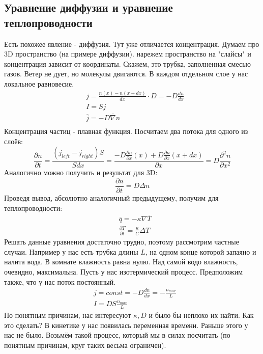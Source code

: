 \documentclass[a4paper, 12pt]{article}
\begin{document}
	\subsection{Уравнение диффузии и уравнение теплопроводности}
	Есть похожее явление - диффузия. Тут уже отличается концентрация. Думаем про 3D пространство (на примере диффузии). нарежем пространство на "слайсы" и концентрация зависит от координаты. Скажем, это трубка, заполненная смесью газов. Ветер не дует, но молекулы двигаются. В каждом отдельном слое у нас локальное равновесие.
	\begin{equation*}
		\begin{aligned}
			& j = \frac{n(x)-n(x+dx)}{dx} \cdot D = - D \frac{dn}{dx} \\
			& I = Sj                                                  \\
			& \overline{j} = - D \overline{\nabla} n                  \\
		\end{aligned}
	\end{equation*}
	Концентрация частиц - плавная функция. Посчитаем два потока для одного из слоёв:
	\begin{equation*}
		\frac{\partial n}{\partial t} =\frac{( j_{left} - j_{right})S} {S dx} = \frac{-D \frac{\partial n}{\partial x} (x) + D \frac{\partial n}{\partial x} (x+dx)}{\partial x} = D \frac{\partial^{2} n}{\partial x^2}
	\end{equation*}
	Аналогично можно получить и результат для 3D:
	\begin{equation*}
		\frac{\partial n}{\partial t} = D \Delta n 
	\end{equation*}
	Проведя вывод, абсолютно аналогичный предыдущему, получим для теплопроводности:
	\begin{equation*}
		\begin{aligned}
			& \overline{q} = - \kappa \nabla \overline{T}               \\
			& \frac{\partial T}{\partial t} = \frac{\kappa}{C} \Delta T 
		\end{aligned}
	\end{equation*}
	Решать данные уравнения достаточно трудно, поэтому рассмотрим частные случаи. Например у нас есть трубка длины $L$, на одном конце которой запаяно и налита вода. В комнате влажность равна нулю. Над самой водо влажность, очевидно, максимальна. Пусть у нас изотермический процесс. Предположим также, что у нас поток постоянный.
	\begin{equation*}
		\begin{aligned}
			& j = const = -D \frac{dn}{dx} = - \frac{n_{max}}{L} \\
			& I = DS\frac{n_{max}}{L}                            
		\end{aligned}
	\end{equation*}
	По понятным причинам, нас интересуют $\kappa, D$ и было бы неплохо их найти. Как это сделать? В кинетике у нас появилась переменная времени. Раньше этого у нас не было. Возьмём такой процесс, который мы в силах посчитать (по понятным причинам, круг таких весьма ограничен).
\end{document}
